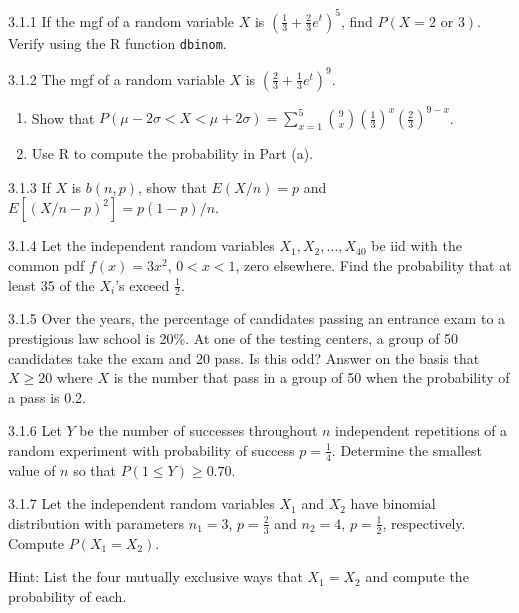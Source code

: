 \begin{exercise}{3.1.1}
If the mgf of a random variable $X$ is $\left(\frac{1}{3} + \frac{2}{3} e^t\right)^5$, find $P(X = 2 \text{ or } 3)$. Verify using the R function \texttt{dbinom}.
\end{exercise}

\begin{exercise}{3.1.2}
The mgf of a random variable $X$ is $(\frac{2}{3} + \frac{1}{3} e^t)^9$.
\begin{enumerate}
\item Show that $P(\mu - 2\sigma < X < \mu + 2\sigma) = \sum_{x=1}^{5} \binom{9}{x} \left(\frac{1}{3}\right)^x \left(\frac{2}{3}\right)^{9-x}$.
\item Use R to compute the probability in Part (a).
\end{enumerate}
\end{exercise}

\begin{exercise}{3.1.3}
If $X$ is $b(n,p)$, show that $E(X/n) = p$ and $E[(X/n - p)^2] = p(1-p)/n$.
\end{exercise}

\begin{exercise}{3.1.4}
Let the independent random variables $X_1, X_2, \ldots, X_{40}$ be iid with the common pdf $f(x) = 3x^2$, $0 < x < 1$, zero elsewhere. Find the probability that at least 35 of the $X_i$'s exceed $\frac{1}{2}$.
\end{exercise}

\begin{exercise}{3.1.5}
Over the years, the percentage of candidates passing an entrance exam to a prestigious law school is 20\%. At one of the testing centers, a group of 50 candidates take the exam and 20 pass. Is this odd? Answer on the basis that $X \geq 20$ where $X$ is the number that pass in a group of 50 when the probability of a pass is 0.2.
\end{exercise}

\begin{exercise}{3.1.6}
Let $Y$ be the number of successes throughout $n$ independent repetitions of a random experiment with probability of success $p = \frac{1}{4}$. Determine the smallest value of $n$ so that $P(1 \leq Y) \geq 0.70$.
\end{exercise}

\begin{exercise}{3.1.7}
Let the independent random variables $X_1$ and $X_2$ have binomial distribution with parameters $n_1 = 3$, $p = \frac{2}{3}$ and $n_2 = 4$, $p = \frac{1}{2}$, respectively. Compute $P(X_1 = X_2)$.

Hint: List the four mutually exclusive ways that $X_1 = X_2$ and compute the probability of each.
\end{exercise}

